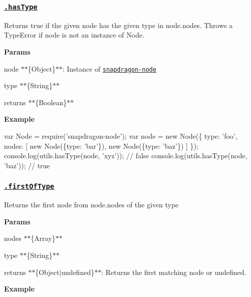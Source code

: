 \subsubsection*{\href{index.js#L486}{\tt .has\+Type}}

Returns true if the given {\ttfamily node} has the given {\ttfamily type} in {\ttfamily node.\+nodes}. Throws a {\ttfamily Type\+Error} if {\ttfamily node} is not an instance of {\ttfamily Node}.

{\bfseries Params}


\begin{DoxyItemize}
\item {\ttfamily node} $\ast$$\ast$\{Object\}$\ast$$\ast$\+: Instance of \href{https://github.com/jonschlinkert/snapdragon-node}{\tt snapdragon-\/node}
\item {\ttfamily type} $\ast$$\ast$\{String\}$\ast$$\ast$
\item {\ttfamily returns} $\ast$$\ast$\{Boolean\}$\ast$$\ast$
\end{DoxyItemize}

{\bfseries Example}


\begin{DoxyCode}
var Node = require('snapdragon-node');
var node = new Node(\{
  type: 'foo',
  nodes: [
    new Node(\{type: 'bar'\}),
    new Node(\{type: 'baz'\})
  ]
\});
console.log(utils.hasType(node, 'xyz')); // false
console.log(utils.hasType(node, 'baz')); // true
\end{DoxyCode}


\subsubsection*{\href{index.js#L519}{\tt .first\+Of\+Type}}

Returns the first node from {\ttfamily node.\+nodes} of the given {\ttfamily type}

{\bfseries Params}


\begin{DoxyItemize}
\item {\ttfamily nodes} $\ast$$\ast$\{Array\}$\ast$$\ast$
\item {\ttfamily type} $\ast$$\ast$\{String\}$\ast$$\ast$
\item {\ttfamily returns} $\ast$$\ast$\{Object$\vert$undefined\}$\ast$$\ast$\+: Returns the first matching node or undefined.
\end{DoxyItemize}

{\bfseries Example}



